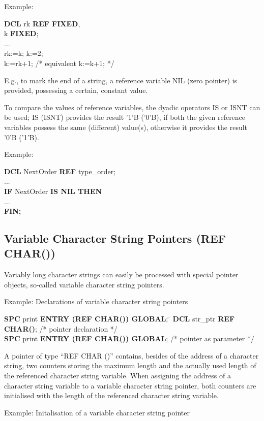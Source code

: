 \begin{tobedone}
Example:

{\bf DCL} rk {\bf REF FIXED},\\
\x k {\bf FIXED};\\
\x ...\\
\x rk:=k; k:=2;\\
\x k:=rk+1; /* equivalent     k:=k+1; */

E.g., to mark the end of a string, a reference variable NIL (zero
pointer) is provided, possessing a certain, constant value.

To compare the values of reference variables, the dyadic operators IS or
ISNT can be used; IS (ISNT) provides the result '1'B ('0'B), if both the
given reference variables possess the same (different) value(s),
otherwise it provides the result '0'B ('1'B).

Example:

{\bf DCL} NextOrder {\bf REF} type\_order;\\
...\\
{\bf IF} NextOrder {\bf IS NIL THEN}\\
\x ...\\
{\bf FIN;}

\subsection{Variable Character String Pointers (REF CHAR())}  %

Variably long character strings can easily be processed with special
pointer objects, so-called variable character string pointers.

Example: Declarations of variable character string pointers

\begin{tabbing}
{\bf SPC} print {\bf ENTRY (REF CHAR()) GLOBAL}; \=  \kill
{\bf DCL} str\_ptr {\bf REF CHAR()}; \> /* pointer declaration */       \\
{\bf SPC} print {\bf ENTRY (REF CHAR()) GLOBAL}; \>  /* pointer as parameter */
\end{tabbing}

A pointer of type ``REF CHAR ()'' contains, besides of the address of a
character string, two counters storing the maximum length and the
actually used length of the referenced character string variable. When
assigning the address of a character string variable to a variable
character string pointer, both counters are initialised with the length
of the referenced character string variable.

Example: Initalisation of a variable character string pointer


\end{tobedone}
